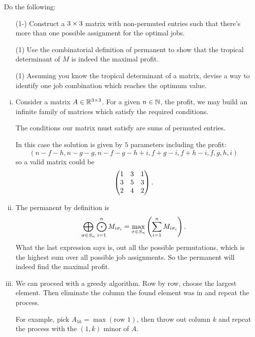 \documentclass[12pt]{memoir}
\theoremstyle{definition}
\begin{document}
\begin{Ej}
    Do the following:
    \begin{enumerate}[i)]
        \itemsep=-0.4em
        \item[(1-)] Construct a $3\times3$ matrix with non-permuted entries such that there's more than one possible assignment for the optimal jobs.
        \item[(1)] Use the combinatorial definition of permanent to show that the tropical determinant of $M$ is indeed the maximal profit. 
        \item[(1)] Assuming you know the tropical determinant of a matrix, devise a way to identify one job combination which reaches the optimum value. 
    \end{enumerate}
\end{Ej}

\begin{ptcb}
    \begin{enumerate}[i)]
        \itemsep=-0.4em
        \item Consider a matrix $A\in \mathbb{R}^{3\times3}$. For a given $n\in\mathbb{N}$, the profit, we may build an infinite family of matrices which satisfy the required conditions.\par 
        The conditions our matrix must satisfy are sums of permuted entries.\par 
        In this case the solution is given by $5$ parameters including the profit:
        $$(n-f-h,n-g-g,n-f-g-h+i,f+g-i,f+h-i,f,g,h,i)$$
        so a valid matrix could be 
        $$\begin{pmatrix} 1 & 3 & 1 \\ 3 & 5 & 3 \\ 2 & 4 & 2 \end{pmatrix}.$$
        \item The permanent by definition is 
        $$\bigoplus_{\sigma\in S_n}\bigodot_{i=1}^n M_{i\sigma_i}=\max_{\sigma\in S_n}\left(\sum_{i=1}^n M_{i\sigma_i}\right).$$
        What the last expression says is, out all the possible permutations, which is the highest sum over all possible job assignments. So the permanent will indeed find the maximal profit.
        \item We can proceed with a greedy algorithm. Row by row, choose the largest element. Then eliminate the column the found element was in and repeat the process.\par 
        For example, pick $A_{1k}=\max(\text{row }1)$, then throw out column $k$ and repeat the process with the $(1,k)$ minor of $A$. 
    \end{enumerate}
\end{ptcb}
\end{document}
